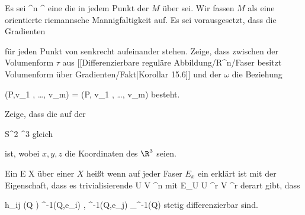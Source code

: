 {}
{

Es sei
\maabbdisp {\varphi} {\R^n } {\R^\ell
} {}
 {} {}
eine
die in jedem Punkt der
$M$ über
\mathl{0 \in \R^\ell}{}
sei. Wir fassen $M$ als eine orientierte riemannsche Mannigfaltigkeit auf. Es sei vorausgesetzt, dass die Gradienten

 {  }

für jeden Punkt von
 senkrecht aufeinander stehen. Zeige, dass zwischen der Volumenform $\tau$ aus
[[Differenzierbare reguläre Abbildung/R^n/Faser besitzt Volumenform über Gradienten/Fakt|Korollar 15.6]]
und der
$\omega$ die Beziehung

\mavergleichskettedisp
{\vergleichskette
{\tau(P,v_1 , \ldots , v_m)
}
{ =} { \pm {} \Vert  \cdots {} \Vert \omega(P, v_1 , \ldots , v_m)
}
{ } {
}
{ } {
}
{ } {
}
}
{}{}{}
besteht.

}
{} {}

{}
{

Zeige, dass die
auf der

\mavergleichskette
{\vergleichskette
{S^2
}
{ \subset }{ \R^3
}
{  }{
}
{    }{
}
{   }{
}
}
{}{}{}
gleich

 {  }

ist, wobei $x,y,z$ die Koordinaten des $\R^3$ seien.

}
{} {}

Ein
 { E } { X
} {}
über einer
$X$ heißt
wenn auf jeder Faser $E_x$ ein
erklärt ist mit der Eigenschaft, dass es trivialisierende
\maabbdisp {\alpha} { U } { V \subseteq \R^n
} {}
mit
\maabbdisp {\theta} {E\vert_U \cong U \times \R^r } { V \times \R^r
} {}
derart gibt, dass

\mavergleichskettedisp
{\vergleichskette
{ h_{ij} (Q )
}
{ } { \left\langle  \theta^{-1}(Q,e_i)  , \theta^{-1}(Q,e_j)    \right\rangle_{\alpha^{-1}(Q)}
}
{ } {
}
{ } {
}
{ } {
}
}
{}{}{}
stetig differenzierbar sind.

